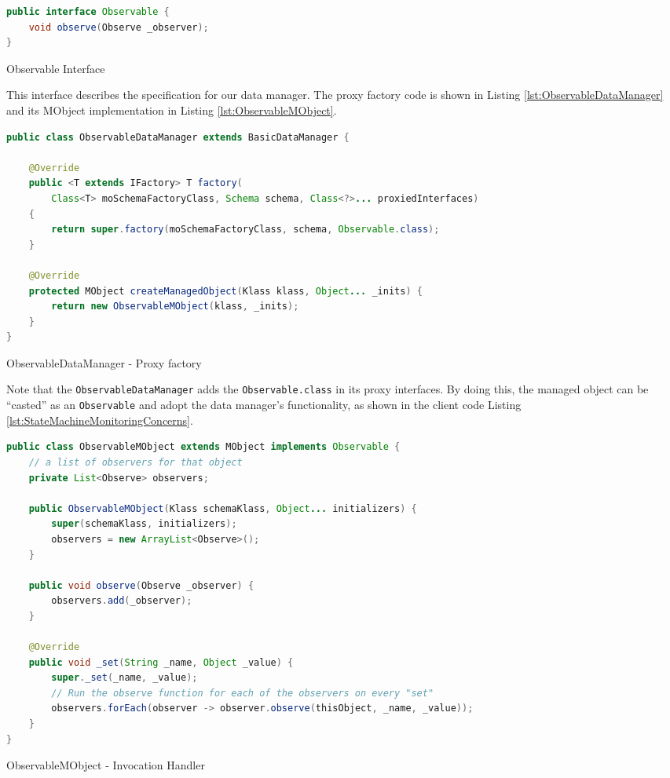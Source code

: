 \begin{sourcecode} [H]
	\begin{lstlisting}[language=Java, escapechar=|]
public interface Observable {
	void observe(Observe _observer);
}
	\end{lstlisting}
	\caption{Observable Interface}
	\label{lst:Observable interface}
\end{sourcecode}

This interface describes the specification for our data manager.
The proxy factory code is shown in Listing \ref{lst:ObservableDataManager} and its MObject implementation in Listing \ref{lst:ObservableMObject}.

\begin{sourcecode} [H]
	\begin{lstlisting}[language=Java, escapechar=|]
public class ObservableDataManager extends BasicDataManager {

    @Override
    public <T extends IFactory> T factory(
    	Class<T> moSchemaFactoryClass, Schema schema, Class<?>... proxiedInterfaces) 
    {
        return super.factory(moSchemaFactoryClass, schema, Observable.class);
    }

    @Override
    protected MObject createManagedObject(Klass klass, Object... _inits) {
        return new ObservableMObject(klass, _inits);
    }
}
	\end{lstlisting}
	\caption{ObservableDataManager - Proxy factory}
	\label{lst:ObservableDataManager}
\end{sourcecode}

Note that the \texttt{ObservableDataManager} adds the \texttt{Observable.class} in its proxy interfaces.
By doing this, the managed object can be ``casted'' as an \texttt{Observable} and adopt the data manager's functionality, as shown in the client code Listing \ref{lst:StateMachineMonitoringConcerns}.

\begin{sourcecode} [H]
	\begin{lstlisting}[language=Java, escapechar=|]
public class ObservableMObject extends MObject implements Observable {
	// a list of observers for that object
	private List<Observe> observers;

	public ObservableMObject(Klass schemaKlass, Object... initializers) {
		super(schemaKlass, initializers);
		observers = new ArrayList<Observe>();
	}

	public void observe(Observe _observer) {
		observers.add(_observer);
	}

	@Override
	public void _set(String _name, Object _value) {
		super._set(_name, _value);
		// Run the observe function for each of the observers on every "set"
		observers.forEach(observer -> observer.observe(thisObject, _name, _value));
	}
}
	\end{lstlisting}
	\caption{ObservableMObject - Invocation Handler}
	\label{lst:ObservableMObject}
\end{sourcecode}


